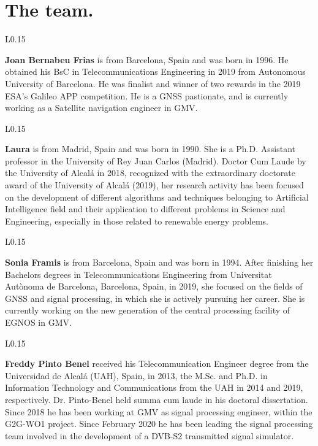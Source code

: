 
\section{The team.}
\begin{wrapfigure}{L}{0.15\textwidth}
    \end{wrapfigure}
\textbf{Joan Bernabeu Frias} is from Barcelona, Spain and was born in 1996. He obtained his BsC in Telecommunications Engineering in 2019 from Autonomous University of Barcelona. He was finalist and winner of two rewards in the 2019 ESA's Galileo APP competition. He is a GNSS pastionate, and is currently working as a Satellite navigation engineer in GMV.\\

\begin{wrapfigure}{L}{0.15\textwidth}
    \end{wrapfigure}
\textbf{Laura} is from Madrid, Spain and was born in 1990. She is a Ph.D. Assistant professor in the University of Rey Juan Carlos (Madrid). Doctor Cum Laude by the University of Alcalá in 2018, recognized with the extraordinary doctorate award of the University of Alcalá (2019), her research activity has been focused on the development of different algorithms and techniques belonging to Artificial Intelligence field and their application to different problems in Science and Engineering, especially in those related to renewable energy problems.\\

\begin{wrapfigure}{L}{0.15\textwidth}
    \end{wrapfigure}
\textbf{Sonia Framis} is from Barcelona, Spain and was born in 1994. After finishing her Bachelors degrees in Telecommunications Engineering from Universitat Autònoma de Barcelona, Barcelona, Spain, in 2019, she focused on the fields of GNSS and signal processing, in which she is actively pursuing her career. She is currently working on the new generation of the central processing facility of EGNOS in GMV.\\
\newpage
\begin{wrapfigure}{L}{0.15\textwidth}
    \end{wrapfigure}
\textbf{Freddy Pinto Benel} received his Telecommunication Engineer degree from the Universidad de Alcalá (UAH), Spain, in 2013, the M.Sc. and Ph.D. in Information Technology and Communications from the UAH in 2014 and 2019, respectively. Dr. Pinto-Benel held summa cum laude in his doctoral dissertation. Since 2018 he has been working at GMV as signal processing engineer, within the G2G-WO1 project. Since February 2020 he has been leading the signal processing team involved in the development of a DVB-S2 transmitted signal simulator.\\


